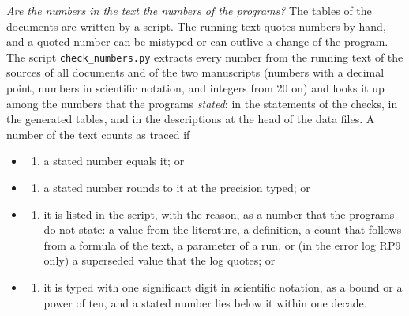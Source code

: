 \documentclass[
  10pt,
]{article}
\providecommand{\tightlist}{%
  \setlength{\itemsep}{0pt}\setlength{\parskip}{0pt}}
\begin{document}
\emph{Are the numbers in the text the numbers of the programs?} The
tables of the documents are written by a script. The running text quotes
numbers by hand, and a quoted number can be mistyped or can outlive a
change of the program. The script \texttt{check\_numbers.py} extracts
every number from the running text of the sources of all documents and
of the two manuscripts (numbers with a decimal point, numbers in
scientific notation, and integers from 20 on) and looks it up among the
numbers that the programs \emph{stated}: in the statements of the
checks, in the generated tables, and in the descriptions at the head of
the data files. A number of the text counts as traced if

\begin{itemize}
\item
  \begin{enumerate}
  \def\labelenumi{(\alph{enumi})}
  \tightlist
  \item
    a stated number equals it; or
  \end{enumerate}
\item
  \begin{enumerate}
  \def\labelenumi{(\alph{enumi})}
  \setcounter{enumi}{17}
  \tightlist
  \item
    a stated number rounds to it at the precision typed; or
  \end{enumerate}
\item
  \begin{enumerate}
  \def\labelenumi{(\alph{enumi})}
  \setcounter{enumi}{1}
  \tightlist
  \item
    it is listed in the script, with the reason, as a number that the
    programs do not state: a value from the literature, a definition, a
    count that follows from a formula of the text, a parameter of a run,
    or (in the error log RP9 only) a superseded value that the log
    quotes; or
  \end{enumerate}
\item
  \begin{enumerate}
  \def\labelenumi{(\alph{enumi})}
  \setcounter{enumi}{2}
  \tightlist
  \item
    it is typed with one significant digit in scientific notation, as a
    bound or a power of ten, and a stated number lies below it within
    one decade.
  \end{enumerate}
\end{itemize}
\end{document}
